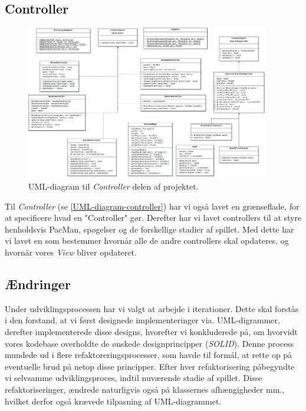 \documentclass{article}
\newcommand{\class}[1]{\textcolor{BlueViolet}{\small\ttfamily\seqsplit{#1}}}
\theoremstyle{mytheoremstyle}
\theoremstyle{mytheoremstyle}
\theoremstyle{myproblemstyle}
\begin{document}
\subsection{Controller}\label{sub:Controller} %
\begin{figure}[H]
    \begin{center}
        \includegraphics[width=0.95\textwidth]{figures/UML-diagram-controller.png}
    \end{center}
    \caption{UML-diagram til \textit{Controller} delen af projektet.}
    \label{UML-diagram-controller}
\end{figure}

Til \textit{Controller} (se \autoref{UML-diagram-controller}) har vi også lavet
en grænseflade, for at specificere hvad en "Controller" gør. Derefter har vi
lavet controllers til at styre henholdsvis PacMan, spøgelser og de forskellige
stadier af spillet. Med dette har vi lavet en \class{MainController} som
bestemmer hvornår alle de andre controllers skal opdateres, og hvornår vores
\textit{View} bliver opdateret.


\subsection{Ændringer}\label{sub:Ændringer} %
Under udviklingsprocessen har vi valgt at arbejde i iterationer. Dette skal
forstås i den forstand, at vi først designede implementeringer via.
UML-digrammer, derefter implementerede disse designs, hvorefter vi konkluderede
på, om hvorvidt vores kodebase overholdte de ønskede designprincipper
(\textit{SOLID}). Denne process mundede ud i flere refaktoreringsprocesser, som
havde til formål, at rette op på eventuelle brud på netop disse principper.
Efter hver refaktorisering påbegyndte vi selvsamme udviklingsproces, indtil
nuværende stadie af spillet. Disse refaktoriseringer, ændrede naturligvis også
på klassernes afhængigheder mm., hvilket derfor også krævede tilpasning af
UML-diagrammet. 
\end{document}
